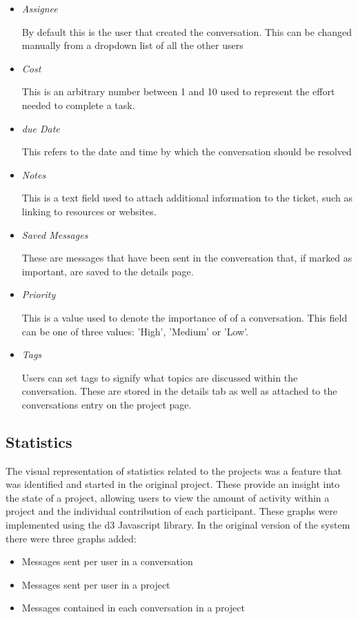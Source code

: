 \documentclass{l4proj}
\begin{document}
\begin{itemize}
\item \textit{Assignee} 
\par By default this is the user that created the conversation.  This can be changed manually from a dropdown list of all the other users
\item \textit{Cost}
\par This is an arbitrary number between 1 and 10 used to represent the effort needed to complete a task. 
\item \textit{due Date}
\par This refers to the date and time by which the conversation should be resolved
\item \textit{Notes}
\par This is a text field used to attach additional information to the ticket, such as linking to resources or websites. 
\item \textit{Saved Messages}
\par These are messages that have been sent in the conversation that, if marked as important, are saved to the details page. 
\item \textit{Priority}
\par This is a value used to denote the importance of of a conversation.  This field can be one of three values: 'High', 'Medium' or 'Low'.
\item \textit{Tags} 
\par Users can set tags to signify what topics are discussed within the conversation.  These are stored in the details tab as well as attached to the conversations entry on the project page.
\end{itemize}

\subsection{Statistics}

The visual representation of statistics related to the projects was a feature that was identified and started in the original project.  These provide an insight into the state of a project, allowing users to view the amount of activity within a project and the individual contribution of each participant.  These graphs were implemented using the d3 Javascript library.
In the original version of the system there were three graphs added:

\begin{itemize}
\item Messages sent per user in a conversation
\item Messages sent per user in a project
\item Messages contained in each conversation in a project
\end{itemize}
\end{document}
